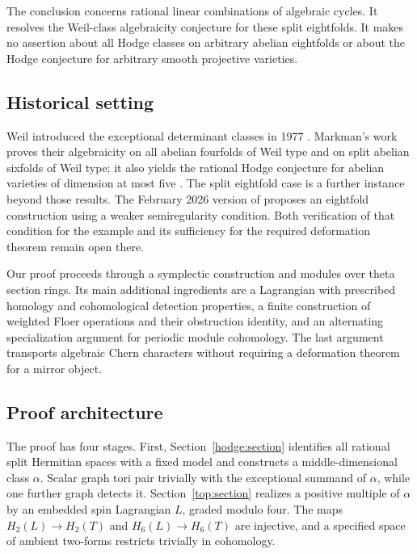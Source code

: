The conclusion concerns rational linear combinations of algebraic cycles.
It resolves the Weil-class algebraicity conjecture for these split
eightfolds.  It makes no assertion about all Hodge classes on arbitrary
abelian eightfolds or about the Hodge conjecture for arbitrary smooth
projective varieties.

\subsection{Historical setting}

Weil introduced the exceptional determinant classes in 1977
\cite{weil}.  Markman's work proves their algebraicity on all abelian
fourfolds of Weil type and on split abelian sixfolds of Weil type;
it also yields the rational Hodge conjecture for abelian varieties of
dimension at most five \cite{markman-sixfold,markman-survey}.
The split eightfold case is a further instance beyond those results.
The February 2026 version of
\cite[Question~11.4 and Section~12]{markman-survey} proposes an eightfold
construction using a weaker semiregularity condition.  Both verification
of that condition for the example and its sufficiency for the required
deformation theorem remain open there.

Our proof proceeds through a symplectic construction and modules over
theta section rings.  Its main additional ingredients are a Lagrangian
with prescribed homology and cohomological detection properties, a finite
construction of weighted Floer operations and their obstruction identity,
and an alternating specialization argument for periodic module
cohomology.  The last argument transports algebraic Chern characters
without requiring a deformation theorem for a mirror object.

\subsection{Proof architecture}

The proof has four stages.  First, Section~\ref{hodge:section} identifies
all rational split Hermitian spaces with a fixed model and constructs
a middle-dimensional class $\alpha$.  Scalar graph tori pair trivially with
the exceptional summand of $\alpha$, while one further graph detects it.
Section~\ref{top:section} realizes a positive multiple
of $\alpha$ by an embedded spin Lagrangian $L$, graded modulo four.  The
maps $H_2(L)\to H_2(T)$ and $H_6(L)\to H_6(T)$ are injective, and a
specified space of ambient two-forms restricts trivially in cohomology.

